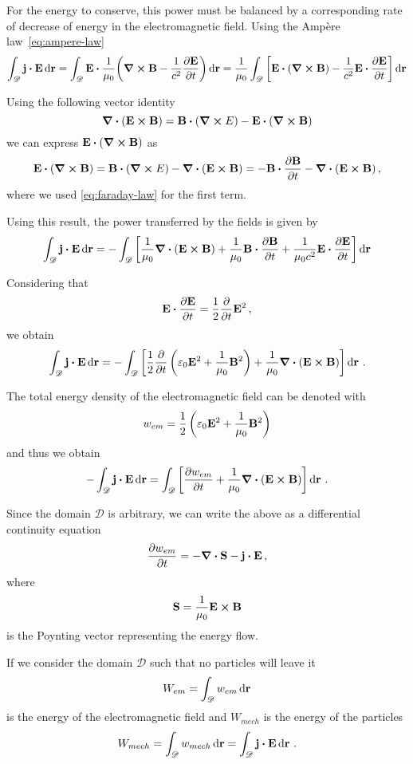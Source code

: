 \documentclass[12pt, class=report, crop=false]{standalone}
\begin{document}
For the energy to conserve, this power must be balanced by a corresponding
rate of decrease of energy in the electromagnetic field.
Using the Ampère law~\eqref{eq:ampere-law}
\[
  \int_{\mathscr{D}} \vb{j} \vdot \vb{E} \dd{\vb{r}} =
  \int_{\mathscr{D}} \vb{E} \vdot \frac{1}{\mu_0} \qty(\curl{\vb{B}} - \frac{1}{c^2} \pdv{\vb{E}}{t}) \dd{\vb{r}} =
  \frac{1}{\mu_0} \int_{\mathscr{D}} \left[\vb{E} \vdot(\curl{\vb{B}}) -
    \frac{1}{c^2} \vb{E} \vdot \pdv{\vb{E}}{t} \right] \dd{\vb{r}}
\]

Using the following vector identity
\[
  \div(\vb{E} \cp \vb{B}) = \vb{B} \vdot (\curl{E}) - \vb{E} \vdot (\curl{\vb{B}})
\]
we can express \(\vb{E} \vdot(\curl{\vb{B}})\) as
\[
  \vb{E} \vdot(\curl{\vb{B}}) = \vb{B} \vdot (\curl{E}) - \div(\vb{E} \cp \vb{B}) =
  - \vb{B} \vdot \pdv{\vb{B}}{t} - \div(\vb{E} \cp \vb{B})\,,
\]
where we used \cref{eq:faraday-law} for the first term.

Using this result, the power transferred by the fields is given by
\[
  \int_{\mathscr{D}} \vb{j} \vdot \vb{E} \dd{\vb{r}} =
  -\int_{\mathscr{D}} \left[\frac{1}{\mu_0} \div(\vb{E} \cp \vb{B}) + \frac{1}{\mu_0} \vb{B} \vdot \pdv{\vb{B}}{t} +
    \frac{1}{\mu_0 c^2} \vb{E} \vdot \pdv{\vb{E}}{t} \right] \dd{\vb{r}}
\]

Considering that
\[
  \vb{E} \vdot \pdv{\vb{E}}{t} = \frac{1}{2} \pdv{t} \vb{E}^2\,,
\]
we obtain
\[
  \int_{\mathscr{D}} \vb{j} \vdot \vb{E} \dd{\vb{r}} =
  -\int_{\mathscr{D}} \left[ \frac{1}{2} \pdv{t}
    \left( \varepsilon_0 \vb{E}^2 + \frac{1}{\mu_0}\vb{B}^2 \right)
  + \frac{1}{\mu_0}\div(\vb{E} \cp \vb{B}) \right] \dd{\vb{r}}\,.
\]

The total energy density of the electromagnetic field can be denoted with
\[
  w_{em} = \frac{1}{2} \left( \varepsilon_0 \vb{E}^2 + \frac{1}{\mu_0}\vb{B}^2 \right)
\]
and thus we obtain
\[
  -\int_{\mathscr{D}} \vb{j} \vdot \vb{E} \dd{\vb{r}} =
  \int_{\mathscr{D}} \left[ \pdv{w_{em}}{t} +
  \frac{1}{\mu_0}\div(\vb{E} \cp \vb{B}) \right] \dd{\vb{r}}\,.
\]

Since the domain \(\mathscr{D}\) is arbitrary, we can write the above as a
differential continuity equation
\begin{equation}
  \label{eq:poynting-theorem-local}
  \pdv{w_{em}}{t} = - \div{\vb{S}} - \vb{j} \vdot \vb{E}\,,
\end{equation}
where
\[
  \vb{S} = \frac{1}{\mu_0} \vb{E} \cp \vb{B}
\]
is the Poynting vector representing the energy flow.

If we consider the domain \(\mathscr{D}\) such that no particles will leave it
\[
  W_{em} = \int_{\mathscr{D}} w_{em} \dd{\vb{r}}
\]
is the energy of the electromagnetic field and \(W_{mech}\) is the
energy of the particles
\[
  W_{mech} = \int_{\mathscr{D}} w_{mech} \dd{\vb{r}} =
  \int_{\mathscr{D}} \vb{j} \vdot \vb{E} \dd{\vb{r}}\,.
\]
\end{document}
